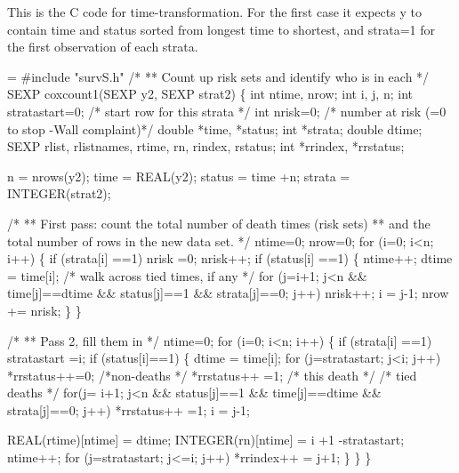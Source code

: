 \documentclass{article}
\begin{document}
This is the C code for time-transformation.
For the first case it expects y to contain time and status sorted from
longest time to shortest, and strata=1 for the first observation of
each strata.  
\begin{nwchunk}
=
 #include "survS.h"
 /*
 ** Count up risk sets and identify who is in each
 */
 SEXP coxcount1(SEXP y2, SEXP strat2) \{
     int ntime, nrow;
     int i, j, n;
     int stratastart=0;  /* start row for this strata */
     int nrisk=0;  /* number at risk (=0 to stop -Wall complaint)*/
     double *time, *status;
     int *strata;
     double dtime;
     SEXP rlist, rlistnames, rtime, rn, rindex, rstatus;
     int *rrindex, *rrstatus;
     
     n = nrows(y2);
     time = REAL(y2);
     status = time +n;
     strata = INTEGER(strat2);
     
     /* 
     ** First pass: count the total number of death times (risk sets)
     **  and the total number of rows in the new data set.
     */
     ntime=0; nrow=0;
     for (i=0; i<n; i++) \{
         if (strata[i] ==1) nrisk =0;
         nrisk++;
         if (status[i] ==1) \{
             ntime++;
             dtime = time[i];
             /* walk across tied times, if any */
             for (j=i+1; j<n && time[j]==dtime && status[j]==1 && strata[j]==0;
                  j++) nrisk++;
             i = j-1;
             nrow += nrisk;
         \}
     \}
     
     /*
     ** Pass 2, fill them in
     */
     ntime=0; 
     for (i=0; i<n; i++) \{
         if (strata[i] ==1) stratastart =i;
         if (status[i]==1) \{
             dtime = time[i];
             for (j=stratastart; j<i; j++) *rrstatus++=0; /*non-deaths */
             *rrstatus++ =1; /* this death */
             /* tied deaths */
             for(j= i+1; j<n && status[j]==1 && time[j]==dtime  && strata[j]==0;
                 j++) *rrstatus++ =1;
             i = j-1;
 
             REAL(rtime)[ntime] = dtime;
             INTEGER(rn)[ntime] = i +1 -stratastart;
             ntime++;
             for (j=stratastart; j<=i; j++) *rrindex++ = j+1;
             \}
     \}
 \}
\end{nwchunk}
\end{document}
